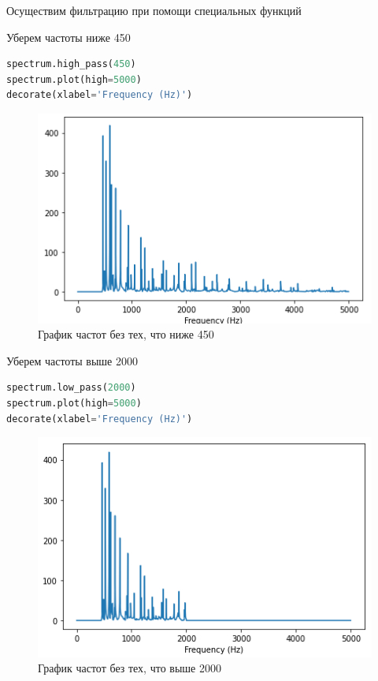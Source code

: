 Осуществим фильтрацию при помощи специальных функций

Уберем частоты ниже 450
\begin{lstlisting}[language=Python]
spectrum.high_pass(450)
spectrum.plot(high=5000)
decorate(xlabel='Frequency (Hz)')
\end{lstlisting}

\begin{figure}[H]
	\begin{center}
		\includegraphics[scale=1]{fig/lab01/lab01_04.png}
		\caption{График частот без тех, что ниже 450}
	\end{center}
\end{figure}

Уберем частоты выше 2000
\begin{lstlisting}[language=Python]
spectrum.low_pass(2000)
spectrum.plot(high=5000)
decorate(xlabel='Frequency (Hz)')
\end{lstlisting}

\begin{figure}[H]
	\begin{center}
		\includegraphics[scale=1]{fig/lab01/lab01_05.png}
		\caption{График частот без тех, что выше 2000}
	\end{center}
\end{figure}


